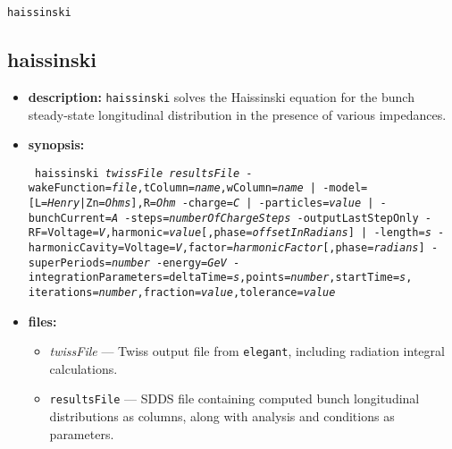 \documentclass[11pt]{article}
\begin{document}
\newpage
\begin{center}{\Large\verb|haissinski|}\end{center}
\subsection{haissinski}

\begin{itemize}
\item {\bf description:}  {\tt haissinski} solves the Haissinski equation for the bunch
 steady-state longitudinal distribution in the presence of various impedances.

\item {\bf synopsis:}
\begin{flushleft}{\tt
haissinski {\em twissFile} {\em resultsFile}
 {-wakeFunction={\em file},tColumn={\em name},wColumn={\em name} |
  -model=[L={\em Henry}|Zn={\em Ohms}],R={\em Ohm}} 
 {-charge={\em C} | -particles={\em value} | -bunchCurrent={\em A}}
 {-steps={\em numberOfChargeSteps}}
 {-outputLastStepOnly}
 {-RF=Voltage={\em V},harmonic={\em value}[,phase={\em offsetInRadians}] | -length={\em s}}
 {-harmonicCavity=Voltage={\em V},factor={\em harmonicFactor}[,phase={\em radians}]}
 {-superPeriods={\em number}}
 {-energy={\em GeV}} 
 -integrationParameters=deltaTime={\em s},points={\em number},startTime={\em s},
iterations={\em number},fraction={\em value},tolerance={\em value} 
}\end{flushleft}

\item {\bf files:}
\begin{itemize}
\item {\em twissFile} --- Twiss output file from {\tt elegant}, including radiation
 integral calculations.
\item {\tt resultsFile} --- SDDS file containing computed bunch longitudinal distributions
 as columns, along with analysis and conditions as parameters.
\end{itemize}


\end{itemize}
\end{document}
